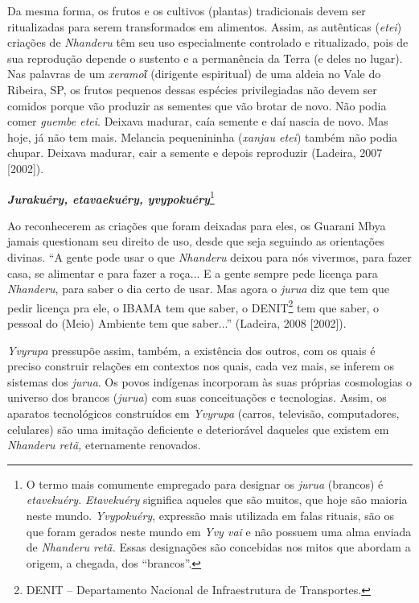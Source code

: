 Da mesma forma, os frutos e os cultivos (plantas) tradicionais devem ser
ritualizadas para serem transformados em alimentos. Assim, as autênticas
(\emph{etei}) criações de \emph{Nhanderu} têm seu uso especialmente
controlado e ritualizado, pois de sua reprodução depende o sustento e a
permanência da Terra (e deles no lugar). Nas palavras de um
\emph{xeramoῖ} (dirigente espiritual) de uma aldeia no Vale do Ribeira,
SP, os frutos pequenos dessas espécies privilegiadas não devem ser
comidos porque vão produzir as sementes que vão brotar de novo. Não
podia comer \emph{guembe etei}. Deixava madurar, caía semente e daí
nascia de novo. Mas hoje, já não tem mais. Melancia pequenininha
(\emph{xanjau etei}) também não podia chupar. Deixava madurar, cair a
semente e depois reproduzir (Ladeira, 2007 {[}2002{]}).

\emph{\textbf{Jurakuéry, etavaekuéry, yvypokuéry}}\footnote{O termo mais
  comumente empregado para designar os \emph{jurua} (brancos) é
  \emph{etavekuéry.} \emph{Etavekuéry} significa aqueles que são muitos,
  que hoje são maioria neste mundo. \emph{Yvypokuéry}, expressão mais
  utilizada em falas rituais, são os que foram gerados neste mundo em
  \emph{Yvy vai} e não possuem uma alma enviada de \emph{Nhanderu retã.}
  Essas designações são concebidas nos mitos que abordam a origem, a
  chegada, dos ``brancos''.}

Ao reconhecerem as criações que foram deixadas para eles, os Guarani
Mbya jamais questionam seu direito de uso, desde que seja seguindo as
orientações divinas. ``A gente pode usar o que \emph{Nhanderu} deixou
para nós vivermos, para fazer casa, se alimentar e para fazer a roça...
E a gente sempre pede licença para \emph{Nhanderu}, para saber o dia
certo de usar. Mas agora o \emph{jurua} diz que tem que pedir licença
pra ele, o IBAMA tem que saber, o DENIT\footnote{DENIT -- Departamento
  Nacional de Infraestrutura de Transportes.} tem que saber, o pessoal
do (Meio) Ambiente tem que saber...'' (Ladeira, 2008 {[}2002{]}).

\emph{Yvyrupa} pressupõe assim, também, a existência dos outros, com os
quais é preciso construir relações em contextos nos quais, cada vez
mais, se inferem os sistemas dos \emph{jurua}. Os povos indígenas
incorporam às suas próprias cosmologias o universo dos brancos
(\emph{jurua}) com suas conceituações e tecnologias. Assim, os aparatos
tecnológicos construídos em \emph{Yvyrupa} (carros, televisão,
computadores, celulares) são uma imitação deficiente e deteriorável
daqueles que existem em \emph{Nhanderu retã,} eternamente renovados.

